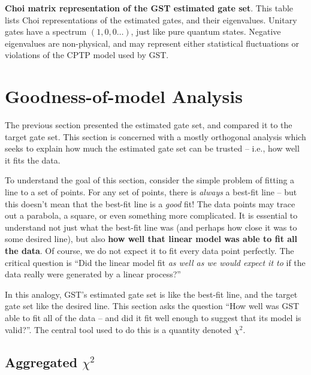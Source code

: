 \documentclass{article}[11pt]
\begin{document}
\begin{table}[h]
\begin{center}
\caption{\textbf{Choi matrix representation of the GST estimated gate set}.  This table lists Choi representations of the estimated gates, and their eigenvalues.  Unitary gates have a spectrum $(1,0,0\ldots)$, just like pure quantum states.  Negative eigenvalues are non-physical, and may represent either statistical fluctuations or violations of the CPTP model used by GST.\label{bestGatesetChoiTable}}
\end{center}
\end{table}



\section{Goodness-of-model Analysis\label{secGoodness}}

The previous section presented the estimated gate set, and compared it to the target gate set.  This section is concerned with a mostly orthogonal analysis which seeks to explain how much the estimated gate set can be trusted -- i.e., how well it fits the data.

To understand the goal of this section, consider the simple problem of fitting a line to a set of points.  For any set of points, there is \emph{always} a best-fit line -- but this doesn't mean that the best-fit line is a \emph{good} fit!  The data points may trace out a parabola, a square, or even something more complicated.  It is essential to understand not just what the best-fit line was (and perhaps how close it was to some desired line), but also \textbf{how well that linear model was able to fit all the data}.  Of course, we do not expect it to fit every data point perfectly.  The critical question is ``Did the linear model fit \emph{as well as we would expect it to} if the data really were generated by a linear process?''

In this analogy, GST's estimated gate set is like the best-fit line, and the target gate set like the desired line.  This section asks the question ``How well was GST able to fit all of the data -- and did it fit well enough to suggest that its model is valid?''. The central tool used to do this is a quantity denoted $\chi^2$.  

\subsection{Aggregated $\chi^2$}
\end{document}
